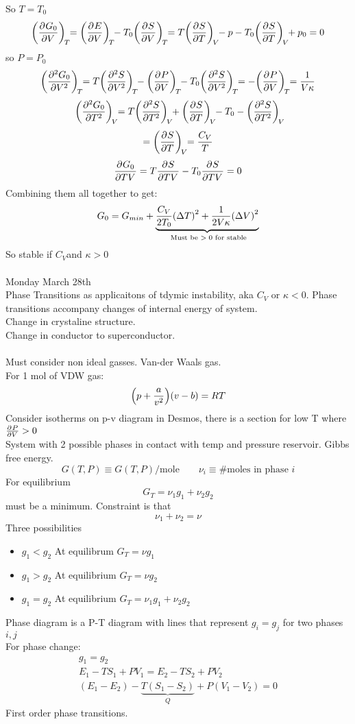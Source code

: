 \documentclass{article}
\begin{document}
So $T=T_0$
$$\pder{G_0}{V}[T]=\pder{E}{V}[T]-T_0\pder{S}{V}[T]=T\pder{S}{T}[V]-p-T_0\pder{S}{T}[V]+p_0=0$$
so $P=P_0$
$$\pder[2]{G_0}{V}[T]=T\pder[2]{S}{V}[T]-\pder{P}{V}[T]-T_0\pder[2]{S}{V}[T]=-\pder{P}{V}[T]=\oo{V\kappa}$$
$$\pder[2]{G_0}{T}[V]=T\pder[2]{S}{T}[V]+\pder{S}{T}[V]-T_0-\pder[2]{S}{T}[V]$$
$$=\pder{S}{T}[V]=\oo[C_V]{T}$$
$$\pder{G_0}{TV}=T\pder{S}{TV}-T_0\pder{S}{TV}=0$$
Combining them all together to get: 
$$G_0=G_{min}+\underbrace{\frac{C_V}{2T_0}\qty(\Delta T)^2+\oo{2V\kappa}\qty(\Delta V)^2}_{\text{ Must be $>0$ for stable}}$$
So stable if $C_V$and $\kappa >0$
\\\\
Monday March 28th\\
Phase Transitions as applicaitons of tdymic instability, aka $C_V$ or $\kappa <0$. Phase transitions accompany changes of internal energy of system.
\\
Change in crystaline structure.
\\
Change in conductor to superconductor.
\\\\
Must consider non ideal gasses. Van-der Waals gas. 
\\
For 1 mol of VDW gas: $$\qty(p+\frac{a}{v^2})(v-b)=RT$$
Consider isotherms on p-v diagram in Desmos, there is a section for low T where $\pder{P}{V}>0$ 
\\
System with 2 possible phases in contact with temp and pressure reservoir. Gibbs free energy. 
$$G(T,P)\equiv G(T,P)/\text{mole}\qquad \nu_i\equiv\text{\# moles in phase\ }i$$
For equilibrium $$G_T=\nu_1g_1+\nu_2g_2$$ must be a minimum. 
Constraint is that $$\nu_1+\nu_2=\nu$$
Three possibilities 
\begin{itemize}
    \item $g_1<g_2$ At equilibrum $G_T=\nu g_1$
    \item $g_1>g_2$ At equilibrium $G_T=\nu g_2$
    \item $g_1=g_2$ At equilibrium $G_T=\nu_1 g_1+\nu_2 g_2$
\end{itemize}
Phase diagram is a P-T diagram with lines that represent $g_i=g_j$ for two phases $i,j$
\\
For phase change:
\begin{gather*}
    g_1=g_2
    \\
    E_1-TS_1+PV_1=E_2-TS_2+PV_2
    \\
    (E_1-E_2)-\underbrace{T(S_1-S_2)}_{Q}+P(V_1-V_2)=0
\end{gather*}
First order phase transitions. \\
\end{document}
